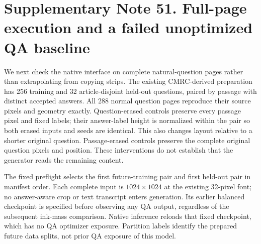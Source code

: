 \documentclass[10pt,a4paper]{article}
\begin{document}
\clearpage
{}

\clearpage
\section*{Supplementary Note 51. Full-page execution and a failed unoptimized QA baseline}

We next check the native interface on complete natural-question pages rather
than extrapolating from copying strips. The existing CMRC-derived preparation
has 256 training and 32 article-disjoint held-out questions, paired by passage
with distinct accepted answers. All 288 normal question pages reproduce their
source pixels and geometry exactly. Question-erased controls preserve every
passage pixel and fixed labels; their answer-label height is normalized within
the pair so both erased inputs and seeds are identical. This also changes
layout relative to a shorter original question. Passage-erased controls
preserve the complete original question pixels and position. These interventions
do not establish that the generator reads the remaining content.

The fixed preflight selects the first future-training pair and first held-out
pair in manifest order. Each complete input is $1024\times1024$ at the existing
32-pixel font; no answer-aware crop or text transcript enters generation.
Its earlier balanced checkpoint is specified before observing any QA output,
regardless of the subsequent ink-mass comparison. Native inference reloads
that fixed checkpoint, which has no QA optimizer exposure. Partition labels
identify the prepared future data splits, not prior QA exposure of this model.
\end{document}
